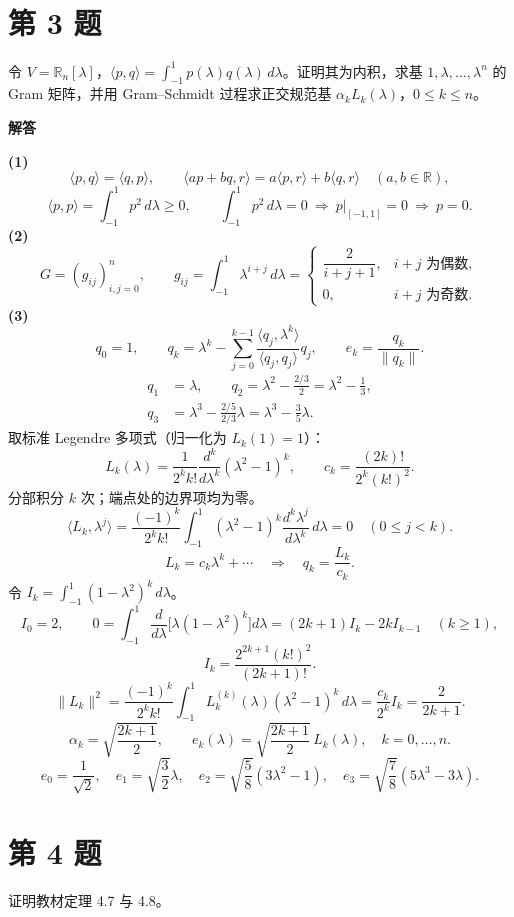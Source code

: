 \documentclass[UTF8,10pt,letterpaper,fontset=fandol]{ctexart}
\newcommand{\R}{\mathbb R}
\newcommand{\ip}[2]{\langle #1,#2\rangle}
\begin{document}
\section{第 3 题}
令 $V=\R_n[\lambda]$，$\ip pq=\int_{-1}^1p(\lambda)q(\lambda)\,d\lambda$。证明其为内积，求基 $1,\lambda,\ldots,\lambda^n$ 的 Gram 矩阵，并用 Gram--Schmidt 过程求正交规范基 $\alpha_kL_k(\lambda)$，$0\le k\le n$。
\par{}\textbf{解答}\par
\textbf{(1)}
\[
 \ip pq=\ip qp,\qquad
 \ip{ap+bq}r=a\ip pr+b\ip qr\quad(a,b\in\R),
\]
\[
 \ip pp=\int_{-1}^1p^2\,d\lambda\ge0,\qquad
 \int_{-1}^1p^2\,d\lambda=0\ \Longrightarrow\ p|_{[-1,1]}=0\ \Longrightarrow\ p=0.
\]
\textbf{(2)}
\[
 \boxed{G=(g_{ij})_{i,j=0}^n,\qquad
 g_{ij}=\int_{-1}^1\lambda^{i+j}\,d\lambda
 =\begin{cases}\dfrac{2}{i+j+1},&i+j\text{ 为偶数},\\[3pt]0,&i+j\text{ 为奇数} .\end{cases}}
\]
\textbf{(3)}
\[
 q_0=1,\qquad
 q_k=\lambda^k-\sum_{j=0}^{k-1}\frac{\ip{q_j}{\lambda^k}}{\ip{q_j}{q_j}}q_j,\qquad
 e_k=\frac{q_k}{\|q_k\|}.
\]
\begin{align*}
 q_1&=\lambda,\qquad
 q_2=\lambda^2-\frac{2/3}{2}=\lambda^2-\frac13,\\
 q_3&=\lambda^3-\frac{2/5}{2/3}\lambda=\lambda^3-\frac35\lambda.
\end{align*}
取标准 Legendre 多项式（归一化为 $L_k(1)=1$）：
\[
 L_k(\lambda)=\frac{1}{2^kk!}\frac{d^k}{d\lambda^k}(\lambda^2-1)^k,
 \qquad c_k=\frac{(2k)!}{2^k(k!)^2}.
\]
分部积分 $k$ 次；端点处的边界项均为零。
\[
 \ip{L_k}{\lambda^j}
 =\frac{(-1)^k}{2^kk!}\int_{-1}^1(\lambda^2-1)^k
 \frac{d^k\lambda^j}{d\lambda^k}\,d\lambda=0\quad(0\le j<k).
\]
\[
 L_k=c_k\lambda^k+\cdots
 \quad\Longrightarrow\quad q_k=\frac{L_k}{c_k}.
\]
令 $I_k=\int_{-1}^1(1-\lambda^2)^k\,d\lambda$。
\[
 I_0=2,\qquad
 0=\int_{-1}^1\frac{d}{d\lambda}\bigl[\lambda(1-\lambda^2)^k\bigr]d\lambda
 =(2k+1)I_k-2kI_{k-1}\quad(k\ge1),
\]
\[
 I_k=\frac{2^{2k+1}(k!)^2}{(2k+1)!}.\]
\[
 \|L_k\|^2=\frac{(-1)^k}{2^kk!}\int_{-1}^1L_k^{(k)}(\lambda)(\lambda^2-1)^k\,d\lambda=\frac{c_k}{2^k}I_k=\frac{2}{2k+1}.
\]
\[
 \boxed{\alpha_k=\sqrt{\frac{2k+1}{2}},\qquad
 e_k(\lambda)=\sqrt{\frac{2k+1}{2}}\,L_k(\lambda),\quad k=0,\ldots,n.}
\]
\[
 e_0=\frac1{\sqrt2},\quad e_1=\sqrt{\frac32}\lambda,\quad
 e_2=\sqrt{\frac58}(3\lambda^2-1),\quad
 e_3=\sqrt{\frac78}(5\lambda^3-3\lambda).
\]
\newpage
\section{第 4 题}
证明教材定理 4.7 与 4.8。
\end{document}
